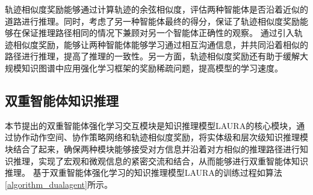 \documentclass[algorithmlist, AutoFakeBold, AutoFakeSlant, figurelist, tablelist, nomlist, engineering]{seuthesix}
\begin{document}
轨迹相似度奖励能够通过计算轨迹的余弦相似度，评估两种智能体是否沿着近似的道路进行推理。同时，考虑了另一种智能体最终的得分，保证了轨迹相似度奖励能够在保证推理路径相同的情况下兼顾对另一个智能体正确性的观察。
通过引入轨迹相似度奖励，能够让两种智能体能够学习通过相互沟通信息，并共同沿着相似的路径进行推理，提高了推理的一致性。另一方面，轨迹相似度奖励还有助于缓解大规模知识图谱中应用强化学习框架的奖励稀疏问题，提高模型的学习速度。

\subsection{双重智能体知识推理}
本节提出的双重智能体强化学习交互模块是知识推理模型LAURA的核心模块，通过协作动作空间、协作策略网络和轨迹相似度奖励，将实体级和层次级知识推理模块结合了起来，确保两种模块能够接受对方信息并沿着对方相似的推理路径进行知识推理，实现了宏观和微观信息的紧密交流和结合，从而能够进行双重智能体知识推理。
基于双重智能体强化学习的知识推理模型LAURA的训练过程如算法\ref{algorithm_dualagent}所示。
\end{document}
